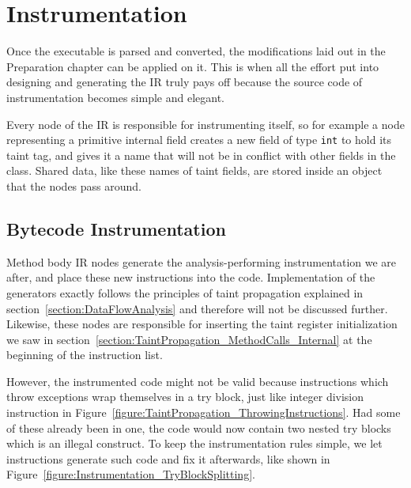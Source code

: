 \documentclass[12pt,twoside,notitlepage]{report}
\begin{document}
\section{Instrumentation}

Once the executable is parsed and converted, the modifications laid out in the Preparation chapter can be applied on it. This is when all the effort put into designing and generating the IR truly pays off because the source code of instrumentation becomes simple and elegant. 

Every node of the IR is responsible for instrumenting itself, so for example a node representing a primitive internal field creates a new field of type \verb$int$ to hold its taint tag, and gives it a name that will not be in conflict with other fields in the class. Shared data, like these names of taint fields, are stored inside an object that the nodes pass around.

\subsection{Bytecode Instrumentation}

Method body IR nodes generate the analysis-performing instrumentation we are after, and place these new instructions into the code. Implementation of the generators exactly follows the principles of taint propagation explained in section~\ref{section:DataFlowAnalysis} and therefore will not be discussed further. Likewise, these nodes are responsible for inserting the taint register initialization we saw in section~\ref{section:TaintPropagation_MethodCalls_Internal} at the beginning of the instruction list.

However, the instrumented code might not be valid because instructions which throw exceptions wrap themselves in a try block, just like integer division instruction in Figure~\ref{figure:TaintPropagation_ThrowingInstructions}. Had some of these already been in one, the code would now contain two nested try blocks which is an illegal construct. To keep the instrumentation rules simple, we let instructions generate such code and fix it afterwards, like shown in Figure~\ref{figure:Instrumentation_TryBlockSplitting}.
\end{document}
